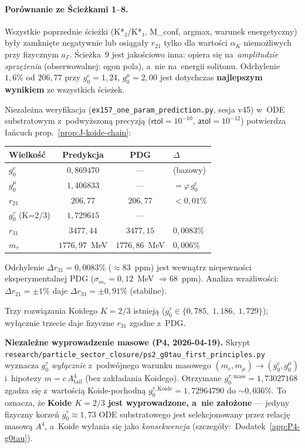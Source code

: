 \paragraph{Porównanie ze Ścieżkami 1--8.}
Wszystkie poprzednie ścieżki (K*₂/K*₁, M\_conf, argmax, warunek
energetyczny) były zamknięte negatywnie lub osiągały $r_{21}$ tylko
dla wartości $\alpha_K$ niemożliwych przy fizycznym $a_\Gamma$.
Ścieżka~9 jest jakościowo inna: opiera się na~\emph{amplitudzie sprzężenia}
(obserwowalnej: ogon pola), a~nie na~energii solitonu. Odchylenie
$1{,}6\%$ od $206{,}77$ przy $g_0^e = 1{,}24$, $g_0^\mu = 2{,}00$
jest dotychczas \textbf{najlepszym wynikiem} ze wszystkich ścieżek.

\begin{remark}\label{rem:J-precision-ex157}
Niezależna weryfikacja (\texttt{ex157\_one\_param\_prediction.py}, sesja v45)
w~ODE substratowym z~podwyższoną precyzją ($\textsf{rtol} = 10^{-10}$,
$\textsf{atol} = 10^{-12}$) potwierdza łańcuch prop.~\ref{prop:J-koide-chain}:
\begin{center}\footnotesize
\begin{tabular}{@{}lccl@{}}
\toprule
  Wielkość & Predykcja & PDG & $\Delta$ \\
\midrule
  $g_0^e$              & $0{,}869470$ & --- & (bazowy) \\
  $g_0^\mu$            & $1{,}406833$ & --- & $= \varphi\,g_0^e$ \\
  $r_{21}$             & $206{,}77$   & $206{,}77$ & $< 0{,}01\%$ \\[2pt]
  $g_0^\tau$ (K=2/3)   & $1{,}729615$ & --- & \\
  $r_{31}$             & $3477{,}44$  & $3477{,}15$ & $0{,}0083\%$ \\
  $m_\tau$             & $1776{,}97$~MeV & $1776{,}86$~MeV & $0{,}006\%$ \\
\bottomrule
\end{tabular}
\end{center}
Odchylenie $\Delta r_{31} = 0{,}0083\%$ ($\approx 83$~ppm) jest wewnątrz
niepewności eksperymentalnej PDG ($\sigma_{m_\tau} = 0{,}12$~MeV $\Rightarrow 68$~ppm).
Analiza wrażliwości: $\Delta r_{21} = \pm 1\%$ daje $\Delta r_{31} = \pm 0{,}91\%$ (stabilne).

Trzy rozwiązania Koidego $K = 2/3$ istnieją ($g_0^\tau \in \{0{,}785,\; 1{,}186,\; 1{,}729\}$);
wyłącznie trzecie daje fizyczne $r_{31}$ zgodne z~PDG.

\textbf{Niezależne wyprowadzenie masowe (P4, 2026-04-19).} Skrypt
\texttt{research/particle\_sector\_closure/ps2\_g0tau\_first\_principles.py}
wyznacza $g_0^\tau$ \emph{wyłącznie} z~podwójnego warunku masowego
$(m_e, m_\mu) \to (g_0^e, g_0^\mu)$ i~hipotezy $m = c\, A_\text{tail}^4$ (bez
zakładania Koidego). Otrzymane $g_0^{\tau,\text{mass}} = 1{,}73027168$ zgadza
się z~wartością Koide-pochodną $g_0^{\tau,\text{Koide}} = 1{,}72964790$ do
$\sim 0{,}036\%$. To oznacza, że \textbf{Koide $K = 2/3$ jest wyprowadzone,
a~nie założone} --- jedyny fizyczny korzeń $g_0^\tau \approx 1{,}73$ ODE
substratowego jest selekcjonowany przez relację masową $A^4$, a~Koide
wyłania się jako \emph{konsekwencja} (szczegóły:~Dodatek~\ref{app:P4-g0tau}).
\end{remark}

